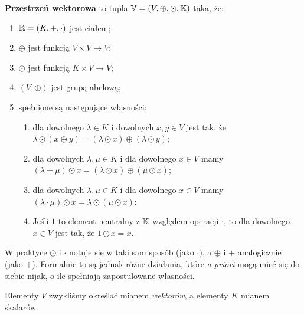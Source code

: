 \begin{definition}
\textbf{Przestrzeń wektorowa} to tupla \( \mathbb{V} = (V, \oplus, \odot, \mathbb{K})\) taka, że: 

\begin{enumerate}
    \item \( \mathbb{K} = (K, +, \cdot) \) jest ciałem;
    \item \( \oplus \) jest funkcją \( V \times V \rightarrow V\);
    \item \( \odot \) jest funkcją \(K \times V \rightarrow V\);
    \item \( (V, \oplus)\) jest grupą abelową;
    \item spełnione są następujące własności:
    \begin{enumerate}
        \item dla dowolnego \( \lambda \in K \) i dowolnych \(x, y \in V\) jest tak, że \( \lambda \odot (x  \oplus y) = (\lambda \odot x) \oplus (\lambda \odot y) \);
        \item dla dowolnych \( \lambda, \mu \in K\) i dla dowolnego \(x \in V\) mamy \( (\lambda + \mu) \odot x = (\lambda \odot x) \oplus (\mu \odot x)\);
        \item dla dowolnych \( \lambda, \mu \in K\) i dla dowolnego \( x \in V\) mamy \((\lambda \cdot \mu) \odot x = \lambda \odot (\mu \odot x)\);
        \item Jeśli \(1\) to element neutralny z \(\mathbb{K}\) względem operacji \(\cdot\), to dla dowolnego \(x \in V\) jest tak, że \(1 \odot x = x\). 
    \end{enumerate}
\end{enumerate}

W praktyce \(\odot\) i \(\cdot\) notuje się w taki sam sposób (jako \(\cdot\)), a \(\oplus\) i \(+\) analogicznie (jako \(+\)). Formalnie to są jednak różne działania, które \textit{a priori} mogą mieć się do siebie nijak, o ile spełniają zapostulowane własności.

Elementy \(V\) zwykliśmy określać mianem \textit{wektorów}, a elementy \(K\) mianem skalarów. 

\end{definition}

